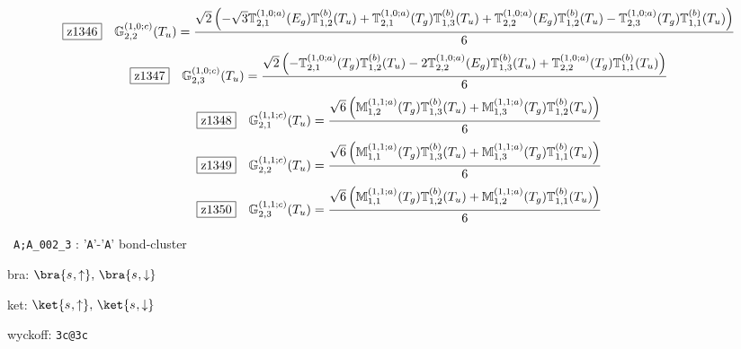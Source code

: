 \documentclass[fleqn,10pt,landscape]{jsarticle}
\begin{document}
\begin{dmath*}
\hspace*{3mm}\fbox{z1346}\quad \mathbb{G}_{2,2}^{(1,0;c)}(T_{u})=\frac{\sqrt{2} \left(- \sqrt{3} \mathbb{T}_{2,1}^{(1,0;a)}(E_{g}) \mathbb{T}_{1,2}^{(b)}(T_{u}) + \mathbb{T}_{2,1}^{(1,0;a)}(T_{g}) \mathbb{T}_{1,3}^{(b)}(T_{u}) + \mathbb{T}_{2,2}^{(1,0;a)}(E_{g}) \mathbb{T}_{1,2}^{(b)}(T_{u}) - \mathbb{T}_{2,3}^{(1,0;a)}(T_{g}) \mathbb{T}_{1,1}^{(b)}(T_{u})\right)}{6}
\end{dmath*}
\begin{dmath*}
\hspace*{3mm}\fbox{z1347}\quad \mathbb{G}_{2,3}^{(1,0;c)}(T_{u})=\frac{\sqrt{2} \left(- \mathbb{T}_{2,1}^{(1,0;a)}(T_{g}) \mathbb{T}_{1,2}^{(b)}(T_{u}) - 2 \mathbb{T}_{2,2}^{(1,0;a)}(E_{g}) \mathbb{T}_{1,3}^{(b)}(T_{u}) + \mathbb{T}_{2,2}^{(1,0;a)}(T_{g}) \mathbb{T}_{1,1}^{(b)}(T_{u})\right)}{6}
\end{dmath*}
\begin{dmath*}
\hspace*{3mm}\fbox{z1348}\quad \mathbb{G}_{2,1}^{(1,1;c)}(T_{u})=\frac{\sqrt{6} \left(\mathbb{M}_{1,2}^{(1,1;a)}(T_{g}) \mathbb{T}_{1,3}^{(b)}(T_{u}) + \mathbb{M}_{1,3}^{(1,1;a)}(T_{g}) \mathbb{T}_{1,2}^{(b)}(T_{u})\right)}{6}
\end{dmath*}
\begin{dmath*}
\hspace*{3mm}\fbox{z1349}\quad \mathbb{G}_{2,2}^{(1,1;c)}(T_{u})=\frac{\sqrt{6} \left(\mathbb{M}_{1,1}^{(1,1;a)}(T_{g}) \mathbb{T}_{1,3}^{(b)}(T_{u}) + \mathbb{M}_{1,3}^{(1,1;a)}(T_{g}) \mathbb{T}_{1,1}^{(b)}(T_{u})\right)}{6}
\end{dmath*}
\begin{dmath*}
\hspace*{3mm}\fbox{z1350}\quad \mathbb{G}_{2,3}^{(1,1;c)}(T_{u})=\frac{\sqrt{6} \left(\mathbb{M}_{1,1}^{(1,1;a)}(T_{g}) \mathbb{T}_{1,2}^{(b)}(T_{u}) + \mathbb{M}_{1,2}^{(1,1;a)}(T_{g}) \mathbb{T}_{1,1}^{(b)}(T_{u})\right)}{6}
\end{dmath*}
\vspace{5mm}

\noindent\textbullet\, \texttt{A;A_002_3} : '\texttt{A}'-'\texttt{A}' bond-cluster

\noindent\quad * bra: $\bra{s_{},\uparrow},\, \bra{s_{},\downarrow}$

\noindent\quad * ket: $\ket{s_{},\uparrow},\, \ket{s_{},\downarrow}$

\noindent\quad * wyckoff: \texttt{3c@3c}
\end{document}

